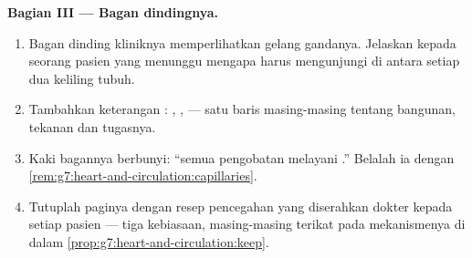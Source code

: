 \begin{problem}
\medskip\noindent\textbf{Bagian III --- Bagan dindingnya.}
\begin{enumerate}[resume]
  \item Bagan dinding kliniknya memperlihatkan gelang gandanya.
        Jelaskan kepada seorang pasien yang menunggu mengapa 
        harus mengunjungi  di antara setiap dua keliling
        tubuh.
  \item Tambahkan keterangan : , ,  ---
        satu baris masing-masing tentang bangunan, tekanan dan
        tugasnya.
  \item Kaki bagannya berbunyi: ``semua pengobatan melayani
        .'' Belalah ia dengan
        \cref{rem:g7:heart-and-circulation:capillaries}.
  \item Tutuplah paginya dengan resep pencegahan yang diserahkan
        dokter  kepada setiap pasien --- tiga kebiasaan,
        masing-masing terikat pada mekanismenya di dalam
        \cref{prop:g7:heart-and-circulation:keep}.
\end{enumerate}
\end{problem}
